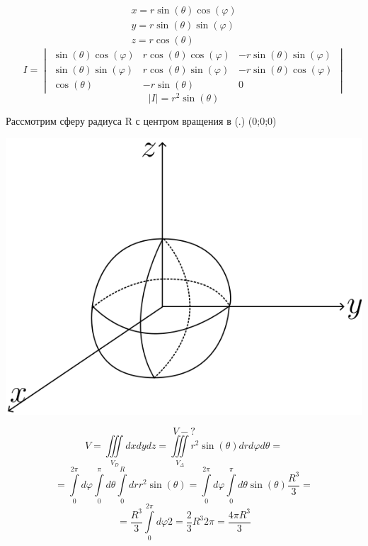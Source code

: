 \documentclass[12pt]{article}
\let\ORIincludegraphics\includegraphics
\renewcommand{\includegraphics}[2][]{\ORIincludegraphics[scale=0.65,#1]{#2}}
\let\oldint\int
\let\oldiiint\iiint
\renewcommand{\int}{\oldint\limits}
\renewcommand{\iiint}{\oldiiint\limits}
\begin{document}
  \hspace{1em}
  \begin{minipage}{0.55\textwidth}
    \[\begin{matrix}
      x=r\sin(\theta)\cos(\varphi)\\
      y=r\sin(\theta)\sin(\varphi)\\
      z=r\cos(\theta)
    \end{matrix}\]\[
    I = \begin{vmatrix}
      \sin(\theta)\cos(\varphi) & r\cos(\theta)\cos(\varphi) & -r\sin(\theta)\sin(\varphi)\\
      \sin(\theta)\sin(\varphi) & r\cos(\theta)\sin(\varphi) & -r\sin(\theta)\cos(\varphi)\\
      \cos(\theta)&-r\sin(\theta)&0
    \end{vmatrix}\]
    \[|I|=r^2\sin(\theta)\]
  \end{minipage}
  \vspace{1em}
  \par
  Рассмотрим сферу радиуса R с центром вращения в (.) (0;0;0)\\
  \begin{minipage}{0.45\textwidth}
    \includegraphics[scale=0.8]{8.25.4.png}
  \end{minipage}
  \hspace{1em}
  \begin{minipage}{0.55\textwidth}
    \[V-?\]
    \[V=\iiint_{V_D}dxdydz=\iiint_{V_\Delta}r^2\sin(\theta)drd\varphi d\theta=\]
    \[=\int_{0}^{2\pi}d\varphi \int_{0}^{\pi}d\theta \int_{0}^{R}dr r^2\sin(\theta)=
    \int_{0}^{2\pi}d\varphi \int_{0}^{\pi}d\theta \sin(\theta) \frac{R^3}{3}=\]
    \[=\frac{R^3}{3}\int_{0}^{2\pi}d\varphi 2=\frac{2}{3}R^3 2\pi=\frac{4 \pi R^3}{3}\]
  \end{minipage}
\end{document}
